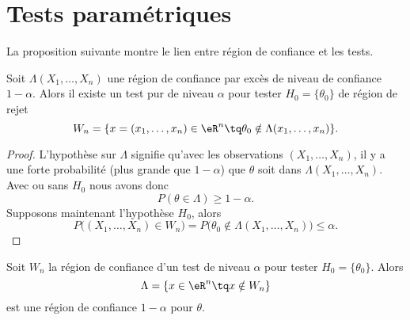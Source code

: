 \section{Tests paramétriques}

La proposition suivante montre le lien entre région de confiance et les tests.
\begin{proposition}
	Soit \( \Lambda(X_1,\ldots, X_n)\) une région de confiance par excès de niveau de confiance \( 1-\alpha\). Alors il existe un test pur de niveau \( \alpha\) pour tester \( H_0=\{ \theta_0 \}\) de région de rejet
	\begin{equation}
		W_n=\{ x=(x_1,\ldots,x_n)\in \eR^n\tq \theta_0\notin\Lambda(x_1,\ldots,x_n) \}.
	\end{equation}
\end{proposition}

\begin{proof}
	L'hypothèse sur \( \Lambda\) signifie qu'avec les observations \( (X_1,\ldots, X_n)\), il y a une forte probabilité (plus grande que \( 1-\alpha\)) que \( \theta\) soit dans \( \Lambda(X_1,\ldots, X_n)\). Avec ou sans \( H_0\) nous avons donc
	\begin{equation}
		P(\theta\in\Lambda)\geq 1-\alpha.
	\end{equation}
	Supposons maintenant l'hypothèse \( H_0\), alors
	\begin{equation}
		P\big( (X_1,\ldots, X_n)\in W_n \big)=P\big( \theta_0\notin\Lambda(X_1,\ldots, X_n) \big)\leq \alpha.
	\end{equation}
\end{proof}

\begin{remark}
	Soit \( W_n\) la région de confiance d'un test de niveau \( \alpha\) pour tester \( H_0=\{ \theta_0 \}\). Alors
	\begin{equation}
		\Lambda=\{ x\in\eR^n\tq x\notin W_n \}
	\end{equation}
	est une région de confiance \( 1-\alpha\) pour \( \theta\).
\end{remark}

